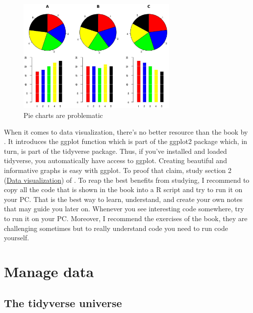 \documentclass[
  12pt,
  oneside]{book}
\begin{document}
\begin{figure}
\centering
\includegraphics[width=0.7\textwidth,height=\textheight]{fig/piebad.jpeg}
\caption[\label{fig:piebad} Pie charts are problematic]{\label{fig:piebad} Pie charts are problematic\footnotemark{}}
\end{figure}

When it comes to data visualization, there's no better resource than the book by \citet{Wickham2023R}. It introduces the ggplot function which is part of the ggplot2 package which, in turn, is part of the tidyverse package. Thus, if you've installed and loaded tidyverse, you automatically have access to ggplot. Creating beautiful and informative graphs is easy with ggplot. To proof that claim, study section 2 (\href{https://r4ds.hadley.nz/data-visualize.html}{Data visualization}) of \citet{Wickham2023R}. To reap the best benefits from studying, I recommend to copy all the code that is shown in the book into a R script and try to run it on your PC. That is the best way to learn, understand, and create your own notes that may guide you later on. Whenever you see interesting code somewhere, try to run it on your PC. Moreover, I recommend the exercises of the book, they are challenging sometimes but to really understand code you need to run code yourself.

\hypertarget{manage-data}{%
\chapter{Manage data}\label{manage-data}}

\hypertarget{the-tidyverse-universe}{%
\section{The tidyverse universe}\label{the-tidyverse-universe}}
\end{document}
